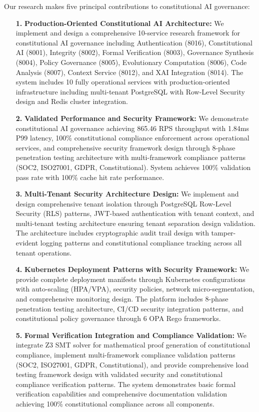 \documentclass[manuscript,screen,9pt]{acmart}
\begin{document}
Our research makes five principal contributions to constitutional AI governance:
\begin{enumerate}[leftmargin=*,itemsep=2pt,parsep=1pt]
    \item[\textbf{1.}] \textbf{Production-Oriented Constitutional AI Architecture:} We implement and design a comprehensive 10-service research framework for constitutional AI governance including Authentication (8016), Constitutional AI (8001), Integrity (8002), Formal Verification (8003), Governance Synthesis (8004), Policy Governance (8005), Evolutionary Computation (8006), Code Analysis (8007), Context Service (8012), and XAI Integration (8014). The system includes 10 fully operational services with production-oriented infrastructure including multi-tenant PostgreSQL with Row-Level Security design and Redis cluster integration.

    \item[\textbf{2.}] \textbf{Validated Performance and Security Framework:} We demonstrate constitutional AI governance achieving 865.46 RPS throughput with 1.84ms P99 latency, 100\% constitutional compliance enforcement across operational services, and comprehensive security framework design through 8-phase penetration testing architecture with multi-framework compliance patterns (SOC2, ISO27001, GDPR, Constitutional). System achieves 100\% validation pass rate with 100\% cache hit rate performance.

    \item[\textbf{3.}] \textbf{Multi-Tenant Security Architecture Design:} We implement and design comprehensive tenant isolation through PostgreSQL Row-Level Security (RLS) patterns, JWT-based authentication with tenant context, and multi-tenant testing architecture ensuring tenant separation design validation. The architecture includes cryptographic audit trail design with tamper-evident logging patterns and constitutional compliance tracking across all tenant operations.

    \item[\textbf{4.}] \textbf{Kubernetes Deployment Patterns with Security Framework:} We provide complete deployment manifests through Kubernetes configurations with auto-scaling (HPA/VPA), security policies, network micro-segmentation, and comprehensive monitoring design. The platform includes 8-phase penetration testing architecture, CI/CD security integration patterns, and constitutional policy governance through 6 OPA Rego frameworks.

    \item[\textbf{5.}] \textbf{Formal Verification Integration and Compliance Validation:} We integrate Z3 SMT solver for mathematical proof generation of constitutional compliance, implement multi-framework compliance validation patterns (SOC2, ISO27001, GDPR, Constitutional), and provide comprehensive load testing framework design with validated security and constitutional compliance verification patterns. The system demonstrates basic formal verification capabilities and comprehensive documentation validation achieving 100\% constitutional compliance across all components.
\end{enumerate}
\end{document}
